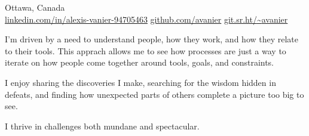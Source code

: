 \documentclass[10pt,letterpaper]{article}
\begin{document}
\sloppy  %


\nobreakvspace{0.3em}  %

\noindent{}\EMAIL\sbull
{}\PHONE \sbull Ottawa, Canada
\\
\href{https://www.linkedin.com/in/alexis-vanier-94705463}{linkedin.com/in/alexis-vanier-94705463}\sbull
\href{https://github.com/avanier}{github.com/avanier}\sbull
\href{https://git.sr.ht/~avanier}{git.sr.ht/{\textasciitilde}avanier}

\spacedhrule{0.9em}{-0.4em}  %



\vspace{-0.5em}  %
\begin{multicols}{2}  %
  \par
    I'm driven by a need to understand people, how they work, and how they
    relate to their tools. This apprach allows me to see how processes are just
    a way to iterate on how people come together around tools, goals, and
    constraints.

  \par
    I enjoy sharing the discoveries I make, searching for the wisdom hidden in
    defeats, and finding how unexpected parts of others complete a picture too
    big to see.

  \par
    I thrive in challenges both mundane and spectacular.
\end{multicols}

\spacedhrule{0em}{0em}


\end{document}
